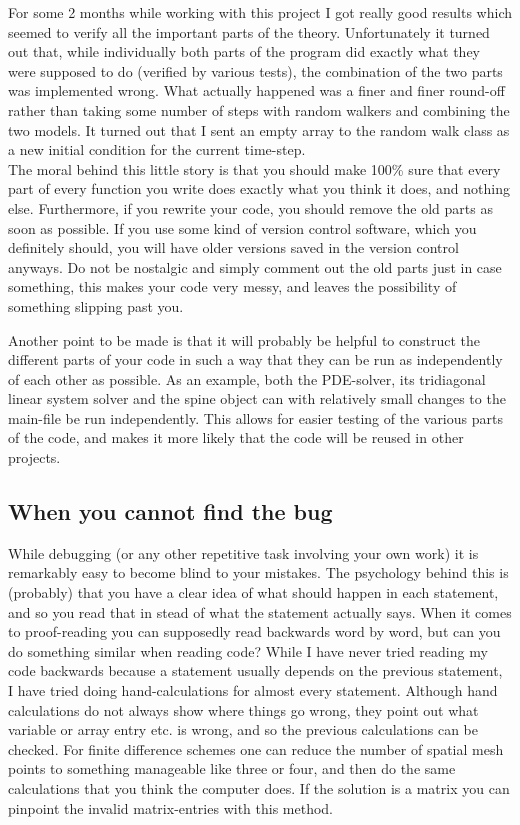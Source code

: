 For some 2 months while working with this project I got really good results which seemed to verify all the important parts of the theory. 
Unfortunately it turned out that, while individually both parts of the program did exactly what they were supposed to do (verified by various tests), the combination of the two parts was implemented wrong. 
What actually happened was a finer and finer round-off rather than taking some number of steps with random walkers and combining the two models. 
It turned out that I sent an empty array to the random walk class as a new initial condition for the current time-step. \\
The moral behind this little story is that you should make 100\% sure that every part of every function you write does exactly what you think it does, and nothing else. 
Furthermore, if you rewrite your code, you should remove the old parts as soon as possible. If you use some kind of version control software, which you definitely should, you will have older versions saved in the version control anyways. Do not be nostalgic and simply comment out the old parts just in case something, this makes your code very messy, and leaves the possibility of something slipping past you.

Another point to be made is that it will probably be helpful to construct the different parts of your code in such a way that they can be run as independently of each other as possible. 
As an example, both the PDE-solver, its tridiagonal linear system solver and the spine object can with relatively small changes to the main-file be run independently. 
This allows for easier testing of the various parts of the code, and makes it more likely that the code will be reused in other projects.

\subsection{When you cannot find the bug}

While debugging (or any other repetitive task involving your own work) it is remarkably easy to become blind to your mistakes. 
The psychology behind this is (probably) that you have a clear idea of what should happen in each statement, and so you read that in stead of what the statement actually says. 
When it comes to proof-reading you can supposedly read backwards word by word, but can you do something similar when reading code? 
While I have never tried reading my code backwards because a statement usually depends on the previous statement, I have tried doing hand-calculations for almost every statement. 
Although hand calculations do not always show where things go wrong, they point out what variable or array entry etc. is wrong, and so the previous calculations can be checked. 
For finite difference schemes one can reduce the number of spatial mesh points to something manageable like three or four, and then do the same calculations that you think the computer does. If the solution is a matrix you can pinpoint the invalid matrix-entries with this method.\\

